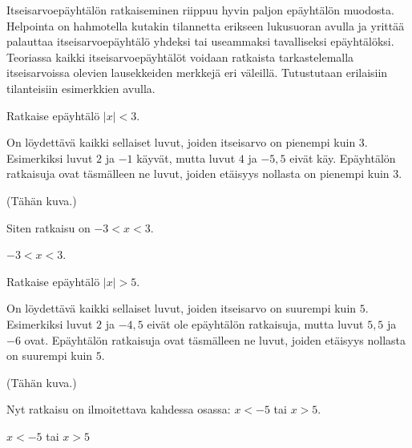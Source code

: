
Itseisarvoepäyhtälön ratkaiseminen riippuu hyvin paljon epäyhtälön muodosta. Helpointa on hahmotella kutakin tilannetta erikseen lukusuoran avulla ja yrittää palauttaa itseisarvoepäyhtälö yhdeksi tai useammaksi tavalliseksi epäyhtälöksi. Teoriassa kaikki itseisarvoepäyhtälöt voidaan ratkaista tarkastelemalla itseisarvoissa olevien lausekkeiden merkkejä eri väleillä. Tutustutaan erilaisiin tilanteisiin esimerkkien avulla.

\begin{esimerkki}
Ratkaise epäyhtälö $|x|<3$.

\begin{esimratk}
On löydettävä kaikki sellaiset luvut, joiden itseisarvo on pienempi kuin $3$. Esimerkiksi luvut $2$ ja $-1$ käyvät, mutta luvut $4$ ja $-5,5$ eivät käy. Epäyhtälön ratkaisuja ovat täsmälleen ne luvut, joiden etäisyys nollasta on pienempi kuin $3$.

(Tähän kuva.)

Siten ratkaisu on $-3<x<3$.
\end{esimratk}

\begin{esimvast}
$-3<x<3$.
\end{esimvast}

\end{esimerkki}

\begin{esimerkki}
Ratkaise epäyhtälö $|x|>5$.

\begin{esimratk}
On löydettävä kaikki sellaiset luvut, joiden itseisarvo on suurempi kuin $5$. Esimerkiksi luvut $2$ ja $-4,5$ eivät ole epäyhtälön ratkaisuja, mutta luvut $5,5$ ja $-6$ ovat. Epäyhtälön ratkaisuja ovat täsmälleen ne luvut, joiden etäisyys nollasta on suurempi kuin $5$.
 
(Tähän kuva.)

Nyt ratkaisu on ilmoitettava kahdessa osassa: $x<-5$ tai $x>5$.
\end{esimratk}

\begin{esimvast}
$x<-5$ tai $x>5$
\end{esimvast}
\end{esimerkki}

